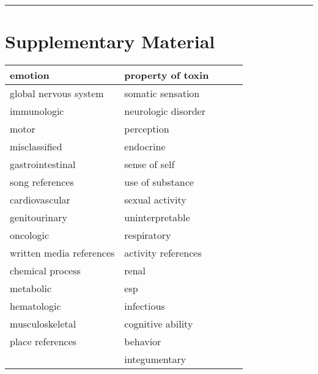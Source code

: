 \documentclass[
]{article}
\begin{document}
\begin{center}\rule{0.5\linewidth}{0.5pt}\end{center}

\hypertarget{header-n43}{%
\section{\texorpdfstring{Supplementary Material
}{Supplementary Material }}\label{header-n43}}

\begin{longtable}[]{@{}lllll@{}}
\toprule
emotion & property of toxin & & &\tabularnewline
\midrule
\endhead
global nervous system & somatic sensation & & &\tabularnewline
immunologic & neurologic disorder & & &\tabularnewline
motor & perception & & &\tabularnewline
misclassified & endocrine & & &\tabularnewline
gastrointestinal & sense of self & & &\tabularnewline
song references & use of substance & & &\tabularnewline
cardiovascular & sexual activity & & &\tabularnewline
genitourinary & uninterpretable & & &\tabularnewline
oncologic & respiratory & & &\tabularnewline
written media references & activity references & & &\tabularnewline
chemical process & renal & & &\tabularnewline
metabolic & esp & & &\tabularnewline
hematologic & infectious & & &\tabularnewline
musculoskeletal & cognitive ability & & &\tabularnewline
place references & behavior & & &\tabularnewline
& integumentary & & &\tabularnewline
\bottomrule
\end{longtable}
\end{document}
